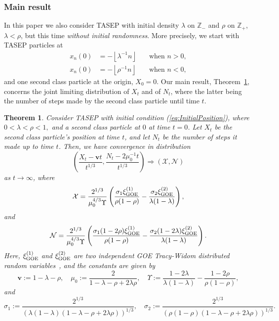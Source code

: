 \documentclass[12pt,a4paper]{article}
\numberwithin{equation}{section}
\newcommand{\Z}{\mathbb{Z}}
\newtheorem{thm}[prop]{Theorem}
\begin{document}
\subsubsection*{Main result}
In this paper we also consider TASEP with initial density $\lambda$ on $\Z_-$ and $\rho$ on $\Z_+$, $\lambda<\rho$, but this time \emph{without initial randomness}. More precisely, we start with TASEP particles at
\begin{equation}\label{eq:InitialPosition}
 \begin{aligned}
 x_{n}(0)&=-\left\lfloor \lambda^{-1} n\right\rfloor&\quad \text{when }n>0,\\
 x_{n}(0)&=-\left\lfloor \rho^{-1} n \right\rfloor& \quad \text{when }n<0,
 \end{aligned}
\end{equation}
and one second class particle at the origin, $X_0=0$. Our main result, Theorem~\ref{MainTheoremForDifferentDensity}, concerns the joint limiting distribution of $X_t$ and of $N_t$, where the latter being the number of steps made by the second class particle until time $t$.
\begin{thm}\label{MainTheoremForDifferentDensity}
Consider TASEP with initial condition (\ref{eq:InitialPosition}), where  $0<\lambda<\rho<1, $ and  a  second class particle  at $0$ at time $t=0$. Let  $X_t$ be the second class particle's position at time $t$, and let $N_t$ be the number of steps it made up to time $t$.
Then, we have convergence in distribution
\begin{equation}\label{eq:ConvJointLaw}
\left(\frac{X_t- \mathbf{v}t }{t^{1/3}},\frac{N_t- 2\mu_0^{-1} t}{t^{1/3}}\right)\Rightarrow (\mathcal{X}, \mathcal{N})
 \end{equation}
as $t\to\infty$, where
 \begin{equation}\label{eq:SecondClassDistribution}
 \mathcal{X}=\frac{2^{1/3}}{\mu^{4/3}_0\Upsilon} \left(\frac{\sigma_1\xi_{\rm GOE}^{(1)}}{\rho(1-\rho)}-\frac{\sigma_2\xi_{\rm GOE}^{(2)}}{\lambda(1-\lambda)}\right),
 \end{equation}
 and
 \begin{equation}\label{eq:NumberoOfJumpsDistribution}
 \mathcal{N}= \frac{2^{1/3}}{\mu^{4/3}_0\Upsilon} \left(\frac{\sigma_1(1-2\rho)\xi_{\rm GOE}^{(1)}}{\rho(1-\rho)}-\frac{\sigma_2(1-2\lambda)\xi_{\rm GOE}^{(2)}}{\lambda(1-\lambda)}\right).
 \end{equation}
Here, $\xi_{\rm GOE}^{(1)}$ and $\xi_{\rm GOE}^{(2)}$ are two \emph{independent} GOE Tracy-Widom distributed random variables~\cite{TW96}, and the constants are given by
 \begin{equation}\label{const1}
 \mathbf{v}:=1-\lambda-\rho,\quad\mu_0:= \frac{2}{1-\lambda-\rho+2\lambda\rho}, \quad\Upsilon:= \frac{1-2\lambda}{\lambda(1-\lambda)} - \frac{1-2\rho}{\rho(1-\rho)},
 \end{equation}
 and
 \begin{equation}\label{const2}\sigma_1:= \frac{2^{1/3}}{\left(\lambda(1-\lambda)(1-\lambda-\rho+2\lambda\rho)\right)^{1/3}},
 \quad \sigma_2:= \frac{2^{1/3}}{\left(\rho(1-\rho)(1-\lambda-\rho+2\lambda\rho)\right)^{1/3}}.
\end{equation}
\end{thm}
\end{document}
